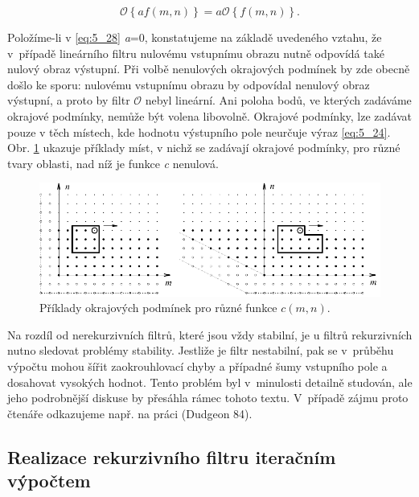 \begin{equation} \label{eq:5_28}
    \mathscr{O} \left\{ af(m, n) \right\} = a \mathscr{O} \left\{ f(m, n) \right\}.
\end{equation}

Položíme-li v \eqref{eq:5_28} \textit{a}=0, konstatujeme na základě uvedeného vztahu, že v~případě lineárního filtru nulovému vstupnímu obrazu nutně odpovídá také nulový obraz výstupní. Při volbě nenulových okrajových podmínek by zde obecně došlo ke sporu: nulovému vstupnímu obrazu by odpovídal nenulový obraz výstupní, a proto by filtr $\mathscr{O}$ nebyl lineární. Ani poloha bodů, ve kterých zadáváme okrajové podmínky, nemůže být volena libovolně. Okrajové podmínky, lze zadávat pouze v těch místech, kde hodnotu výstupního pole neurčuje výraz \eqref{eq:5_24}. Obr. \ref{img:5_3} ukazuje příklady míst, v nichž se zadávají okrajové podmínky, pro různé tvary oblasti, nad níž je funkce \textit{c} nenulová.

\begin{figure}[th]
    \begin{center}
        \includegraphics[scale=0.88]{05_filtrace/images/img_5_3.pdf}
    \end{center}
    \caption{Příklady okrajových podmínek pro různé funkce $c(m, n)$.}
    \label{img:5_3}
\end{figure}

Na rozdíl od nerekurzivních filtrů, které jsou vždy stabilní, je u filtrů rekurzivních nutno sledovat problémy stability. Jestliže je filtr nestabilní, pak se v~průběhu výpočtu mohou šířit zaokrouhlovací chyby a případné šumy vstupního pole a dosahovat vysokých hodnot. Tento problém byl v~minulosti detailně studován, ale jeho podrobnější diskuse by přesáhla rámec tohoto textu. V~případě zájmu proto čtenáře odkazujeme např. na práci (Dudgeon 84).

\subsection*{Realizace rekurzivního filtru iteračním výpočtem}

